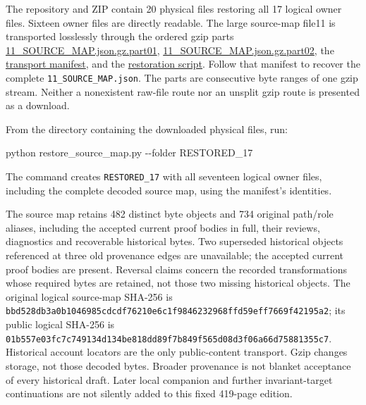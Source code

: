 \documentclass[
]{article}
\newenvironment{Shaded}{}{}
\newcommand{\NormalTok}[1]{#1}
\newcounter{none} %
\begin{document}
The repository and ZIP contain 20 physical files restoring all 17
logical owner files. Sixteen owner files are directly readable. The
large source-map file11 is transported losslessly through the ordered
gzip parts
\href{https://github.com/KokunoYumeto/zeta-function-research-reader/blob/0512b18d5479f3abc24ae654f8ffee4e5d53922e/workbenches/splitzero-tandem/continuations/20260915-native-boundary-continuation/11_SOURCE_MAP.json.gz.part01}{11\_SOURCE\_MAP.json.gz.part01},
\href{https://github.com/KokunoYumeto/zeta-function-research-reader/blob/0512b18d5479f3abc24ae654f8ffee4e5d53922e/workbenches/splitzero-tandem/continuations/20260915-native-boundary-continuation/11_SOURCE_MAP.json.gz.part02}{11\_SOURCE\_MAP.json.gz.part02},
the
\href{https://github.com/KokunoYumeto/zeta-function-research-reader/blob/0512b18d5479f3abc24ae654f8ffee4e5d53922e/workbenches/splitzero-tandem/continuations/20260915-native-boundary-continuation/SOURCE_MAP_TRANSPORT.json}{transport
manifest}, and the
\href{https://github.com/KokunoYumeto/zeta-function-research-reader/blob/0512b18d5479f3abc24ae654f8ffee4e5d53922e/workbenches/splitzero-tandem/continuations/20260915-native-boundary-continuation/restore_source_map.py}{restoration
script}. Follow that manifest to recover the complete
\texttt{11\_SOURCE\_MAP.json}. The parts are consecutive byte ranges of
one gzip stream. Neither a nonexistent raw-file route nor an unsplit
gzip route is presented as a download.

From the directory containing the downloaded physical files, run:

\begin{Shaded}
\begin{Highlighting}[]
\NormalTok{python restore\_source\_map.py {-}{-}folder RESTORED\_17}
\end{Highlighting}
\end{Shaded}

The command creates \texttt{RESTORED\_17} with all seventeen logical
owner files, including the complete decoded source map, using the
manifest's identities.

The source map retains 482 distinct byte objects and 734 original
path/role aliases, including the accepted current proof bodies in full,
their reviews, diagnostics and recoverable historical bytes. Two
superseded historical objects referenced at three old provenance edges
are unavailable; the accepted current proof bodies are present. Reversal
claims concern the recorded transformations whose required bytes are
retained, not those two missing historical objects. The original logical
source-map SHA-256 is
\texttt{bbd528db3a0b1046985cdcdf76210e6c1f9846232968ffd59eff7669f42195a2};
its public logical SHA-256 is
\texttt{01b557e03fc7c749134d134be818dd89f7b849f565d08d3f06a66d75881355c7}.
Historical account locators are the only public-content transport. Gzip
changes storage, not those decoded bytes. Broader provenance is not
blanket acceptance of every historical draft. Later local companion and
further invariant-target continuations are not silently added to this
fixed 419-page edition.
\end{document}
